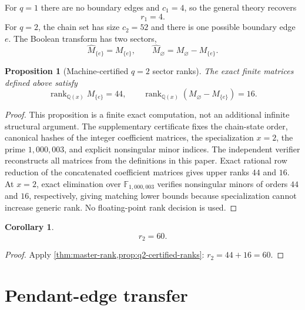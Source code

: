 \documentclass[11pt,reqno]{amsart}
\newtheorem{proposition}[proposition]{Proposition}
\newtheorem{corollary}[corollary]{Corollary}
\theoremstyle{definition}
\begin{document}
For $q=1$ there are no boundary edges and $c_1=4$, so the general theory
recovers
\[
 r_1=4.
\]
For $q=2$, the chain set has size $c_2=52$ and there is one possible boundary
edge $e$.  The Boolean transform has two sectors,
\[
 \widehat M_{\{e\}}=M_{\{e\}},
 \qquad
 \widehat M_{\varnothing}=M_{\varnothing}-M_{\{e\}}.
\]

\begin{proposition}[Machine-certified $q=2$ sector ranks]
\label{prop:q2-certified-ranks}
The exact finite matrices defined above satisfy
\begin{equation}\label{eq:q2-ranks}
 \operatorname{rank}_{\mathbb Q(x)}M_{\{e\}}=44,
 \qquad
 \operatorname{rank}_{\mathbb Q(x)}(M_{\varnothing}-M_{\{e\}})=16.
\end{equation}
\end{proposition}

\begin{proof}
This proposition is a finite exact computation, not an additional infinite
structural argument.  The supplementary certificate
 fixes the chain-state order,
canonical hashes of the integer coefficient matrices, the specialization
$x=2$, the prime $1{,}000{,}003$, and explicit nonsingular minor indices.
The independent verifier
 reconstructs all matrices
from the definitions in this paper.  Exact rational row reduction of the
concatenated coefficient matrices gives upper ranks $44$ and $16$.  At $x=2$,
exact elimination over $\mathbb F_{1{,}000{,}003}$ verifies nonsingular minors
of orders $44$ and $16$, respectively, giving matching lower bounds because
specialization cannot increase generic rank.  No floating-point rank decision
is used.
\end{proof}

\begin{corollary}\label{cor:r2}
\begin{equation}\label{eq:r2}
 \boxed{r_2=60.}
\end{equation}
\end{corollary}

\begin{proof}
Apply \cref{thm:master-rank,prop:q2-certified-ranks}:
$r_2=44+16=60$.
\end{proof}


\section{Pendant-edge transfer}\label{sec:edge-extension}
\end{document}
